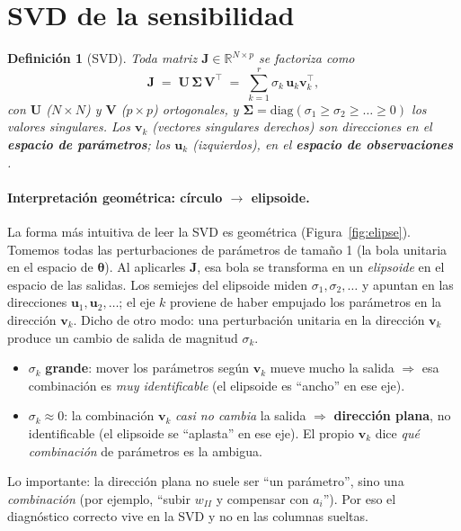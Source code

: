 \documentclass[11pt,a4paper]{article}
\newtheorem{definition}{Definición}
\newcommand{\R}{\mathbb{R}}
\newcommand{\thetavec}{\bm{\theta}}
\newcommand{\transp}{^{\top}}
\newcommand{\J}{\mathbf{J}}
\begin{document}
\section{SVD de la sensibilidad}
\label{sec:svd}

\begin{definition}[SVD]
Toda matriz $\J\in\R^{N\times p}$ se factoriza como
\begin{equation}
  \J \;=\; \mathbf{U}\,\bm{\Sigma}\,\mathbf{V}\transp
       \;=\; \sum_{k=1}^{r}\sigma_k\,\mathbf{u}_k\mathbf{v}_k\transp,
  \label{eq:svd}
\end{equation}
con $\mathbf{U}$ ($N\times N$) y $\mathbf{V}$ ($p\times p$) \emph{ortogonales}, y $\bm{\Sigma}=\mathrm{diag}(\sigma_1\ge\sigma_2\ge\dots\ge0)$ los \emph{valores singulares}. Los $\mathbf{v}_k$ (vectores singulares derechos) son direcciones en el \textbf{espacio de parámetros}; los $\mathbf{u}_k$ (izquierdos), en el \textbf{espacio de observaciones} \cite{golub2013}.
\end{definition}

\paragraph{Interpretación geométrica: círculo $\to$ elipsoide.} La forma más intuitiva de leer la SVD es geométrica (Figura~\ref{fig:elipse}). Tomemos todas las perturbaciones de parámetros de tamaño 1 (la bola unitaria en el espacio de $\thetavec$). Al aplicarles $\J$, esa bola se transforma en un \emph{elipsoide} en el espacio de las salidas. Los semiejes del elipsoide miden $\sigma_1,\sigma_2,\dots$ y apuntan en las direcciones $\mathbf{u}_1,\mathbf{u}_2,\dots$; el eje $k$ proviene de haber empujado los parámetros en la dirección $\mathbf{v}_k$. Dicho de otro modo: una perturbación unitaria en la dirección $\mathbf{v}_k$ produce un cambio de salida de magnitud $\sigma_k$.
\begin{itemize}[nosep]
  \item $\sigma_k$ \textbf{grande}: mover los parámetros según $\mathbf{v}_k$ mueve mucho la salida $\Rightarrow$ esa combinación es \emph{muy identificable} (el elipsoide es ``ancho'' en ese eje).
  \item $\sigma_k\approx 0$: la combinación $\mathbf{v}_k$ \emph{casi no cambia} la salida $\Rightarrow$ \textbf{dirección plana}, no identificable (el elipsoide se ``aplasta'' en ese eje). El propio $\mathbf{v}_k$ dice \emph{qué combinación} de parámetros es la ambigua.
\end{itemize}
Lo importante: la dirección plana no suele ser ``un parámetro'', sino una \emph{combinación} (por ejemplo, ``subir $w_{II}$ y compensar con $a_i$''). Por eso el diagnóstico correcto vive en la SVD y no en las columnas sueltas.
\end{document}
